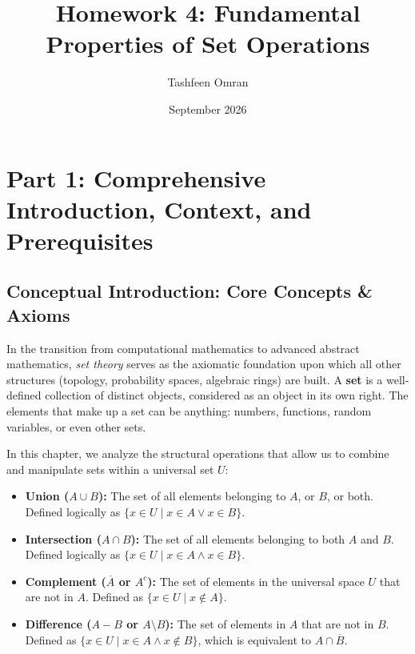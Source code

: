 \documentclass[11pt]{article}
\title{\textbf{Homework 4: Fundamental Properties of Set Operations}}
\author{Tashfeen Omran}
\date{September 2026}
\theoremstyle{definition}
\begin{document}
\maketitle
\tableofcontents
\newpage

\section{Part 1: Comprehensive Introduction, Context, and Prerequisites}

\subsection{Conceptual Introduction: Core Concepts \& Axioms}
In the transition from computational mathematics to advanced abstract mathematics, \textit{set theory} serves as the axiomatic foundation upon which all other structures (topology, probability spaces, algebraic rings) are built. A \textbf{set} is a well-defined collection of distinct objects, considered as an object in its own right. The elements that make up a set can be anything: numbers, functions, random variables, or even other sets.

In this chapter, we analyze the structural operations that allow us to combine and manipulate sets within a universal set $U$:
\begin{itemize}
    \item \textbf{Union ($A \cup B$):} The set of all elements belonging to $A$, or $B$, or both. Defined logically as $\{x \in U \mid x \in A \lor x \in B\}$.
    \item \textbf{Intersection ($A \cap B$):} The set of all elements belonging to both $A$ and $B$. Defined logically as $\{x \in U \mid x \in A \land x \in B\}$.
    \item \textbf{Complement ($\overline{A}$ or $A^c$):} The set of elements in the universal space $U$ that are not in $A$. Defined as $\{x \in U \mid x \notin A\}$.
    \item \textbf{Difference ($A - B$ or $A \setminus B$):} The set of elements in $A$ that are not in $B$. Defined as $\{x \in U \mid x \in A \land x \notin B\}$, which is equivalent to $A \cap \overline{B}$.
\end{itemize}
\end{document}

